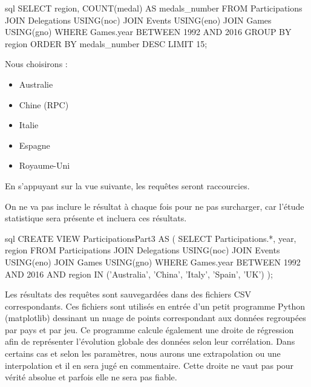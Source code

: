 \documentclass{mytex}
\begin{document}
\begin{codeboxlang}[title=Top 15 régions par médailles]{sql}
	SELECT region, COUNT(medal) AS medals_number
	FROM Participations
	JOIN Delegations USING(noc)
	JOIN Events USING(eno)
	JOIN Games USING(gno)
	WHERE Games.year BETWEEN 1992 AND 2016
	GROUP BY region
	ORDER BY medals_number DESC
	LIMIT 15;
\end{codeboxlang}



Nous choisirons : 
\begin{itemize}
\item Australie
\item Chine (RPC)
\item Italie
\item Espagne
\item Royaume-Uni
\end{itemize}

En s'appuyant sur la vue suivante, les requêtes seront raccourcies.

On ne va pas inclure le résultat à chaque fois pour ne pas surcharger, car l'étude statistique sera présente et incluera ces résultats.


\begin{codeboxlang}[title=Vue exclusive à 1992-2016 et aux 5 pays]{sql}
	CREATE VIEW ParticipationsPart3 AS (
	SELECT Participations.*, year, region
	FROM Participations
	JOIN Delegations USING(noc)
	JOIN Events USING(eno)
	JOIN Games USING(gno)
	WHERE Games.year BETWEEN 1992 AND 2016
	AND region IN ('Australia', 'China', 'Italy', 'Spain', 'UK')
	);
\end{codeboxlang}


Les résultats des requêtes sont sauvegardées dans des fichiers CSV correspondants.
Ces fichiers sont utilisés en entrée d'un petit programme Python (matplotlib) dessinant un nuage de points correspondant aux données regroupées par pays et par jeu. Ce programme calcule également une droite de régression afin de représenter l'évolution globale des données selon leur corrélation. Dans certains cas et selon les paramètres, nous aurons une extrapolation ou une interpolation et il en sera jugé en commentaire. Cette droite ne vaut pas pour vérité absolue et parfois elle ne sera pas fiable.
\end{document}
